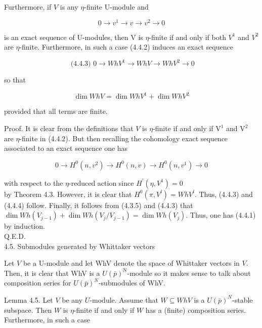 \documentclass[10pt]{article}
\begin{document}
Furthermore, if $V$ is any $\eta$-finite U-module and


\begin{equation*}
0 \rightarrow v^{1} \rightarrow v \rightarrow v^{2} \rightarrow 0 \tag{4.4.2}
\end{equation*}


is an exact sequence of U-modules, then V is $\eta$-finite if and only if both $V^{1}$ and $V^{2}$ are $\eta$-finite. Furthermore, in such a case (4.4.2) induces an exact sequence

$$
\text { (4.4.3) } 0 \rightarrow W h V^{1} \rightarrow W h V \rightarrow W h V^{2} \rightarrow 0
$$

so that


\begin{equation*}
\operatorname{dim} W h V=\operatorname{dim} W h V^{1}+\operatorname{dim} W h V^{2} \tag{4.4.4}
\end{equation*}


provided that all terms are finite.

Proof. It is clear from the definitions that $V$ is $\eta$-finite if and only if $\mathrm{V}^{1}$ and $\mathrm{V}^{2}$ are $\eta$-finite in (4.4.2). But then recalling the cohomology exact sequence associated to an exact sequence one has

$$
0 \rightarrow H^{0}\left(n, v^{2}\right) \rightarrow H^{0}(n, v) \rightarrow H^{0}\left(n, v^{1}\right) \rightarrow 0
$$

with respect to the $\eta$-reduced action since $H^{\prime}\left(\eta, V^{1}\right)=0$\\
by Theorem 4.3. However, it is clear that $H^{0}\left(\pi, V^{l}\right)=W h V^{l}$. Thus, (4.4.3) and (4.4.4) follow. Finally, it follows from (4.3.5) and (4.4.3) that $\operatorname{dim} W h\left(V_{j-1}\right)+ \operatorname{dim} W h\left(V_{j} / V_{j-1}\right)=\operatorname{dim} W h\left(V_{j}\right)$. Thus, one has (4.4.1) by induction.\\
Q.E.D.\\
4.5. Submodules generated by Whittaker vectors

Let $V$ be a U-module and let WhV denote the space of Whittaker vectors in $V$. Then, it is clear that WhV is a $U(\bar{p})^{\mathrm{N}}$-module so it makes sense to talk about composition series for $U(\bar{p})^{N}$-submodules of WhV.

Lemma 4.5. Let $V$ be any $U$-module. Assume that $W \subseteq W h V$ is a $U(\bar{p})^{N}$-stable subspace. Then $W$ is $\eta$-finite if and only if $W$ has a (finite) composition series. Furthermore, in such a case
\end{document}
